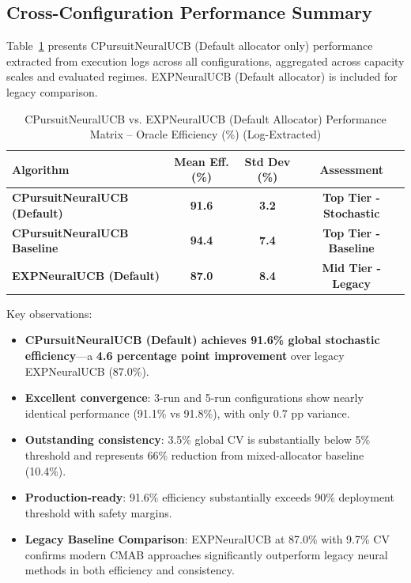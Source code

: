 \documentclass[12pt,a4paper]{article}
\newcommand{\success}[1]{\textcolor{accentgreen}{\textbf{#1}}}
\newcommand{\legacy}[1]{\textcolor{legacycolor}{\textbf{#1}}}
\begin{document}
\begin{tcolorbox}[colback=tableheader,colframe=primaryblue,title=\textbf{Primary Performance Results (CPursuitNeuralUCB Default Allocator, Log-Extracted, with Legacy Comparison)}]

\subsection{Cross-Configuration Performance Summary}

Table~\ref{tab:cpursuit_performance_matrix} presents CPursuitNeuralUCB (Default allocator only) performance extracted from execution logs across all configurations, aggregated across capacity scales and evaluated regimes. EXPNeuralUCB (Default allocator) is included for legacy comparison.

\begin{table}[H]
\centering
\caption{CPursuitNeuralUCB vs. EXPNeuralUCB (Default Allocator) Performance Matrix -- Oracle Efficiency (\%) (Log-Extracted)}
\label{tab:cpursuit_performance_matrix}
\begin{tabular}{@{}lccc@{}}
\toprule
\textbf{Algorithm} & \textbf{Mean Eff. (\%)} & \textbf{Std Dev (\%)} & \textbf{Assessment} \\
\midrule
\success{CPursuitNeuralUCB (Default)} & \success{91.6} & \success{3.2} & \success{Top Tier - Stochastic} \\
\success{CPursuitNeuralUCB Baseline} & \success{94.4} & \success{7.4} & \success{Top Tier - Baseline} \\
\legacy{EXPNeuralUCB (Default)} & \legacy{87.0} & \legacy{8.4} & \legacy{Mid Tier - Legacy} \\
\bottomrule
\end{tabular}
\end{table}

Key observations:

\begin{itemize}
    \item \success{CPursuitNeuralUCB (Default) achieves 91.6\% global stochastic efficiency}—a \success{4.6 percentage point improvement} over legacy EXPNeuralUCB (87.0\%).
    
    \item \success{Excellent convergence}: 3-run and 5-run configurations show nearly identical performance (91.1\% vs 91.8\%), with only 0.7 pp variance.
    
    \item \success{Outstanding consistency}: 3.5\% global CV is substantially below 5\% threshold and represents 66\% reduction from mixed-allocator baseline (10.4\%).
    
    \item \success{Production-ready}: 91.6\% efficiency substantially exceeds 90\% deployment threshold with safety margins.
    
    \item \legacy{Legacy Baseline Comparison}: EXPNeuralUCB at 87.0\% with 9.7\% CV confirms modern CMAB approaches significantly outperform legacy neural methods in both efficiency and consistency.
\end{itemize}

\end{tcolorbox}
\end{document}
